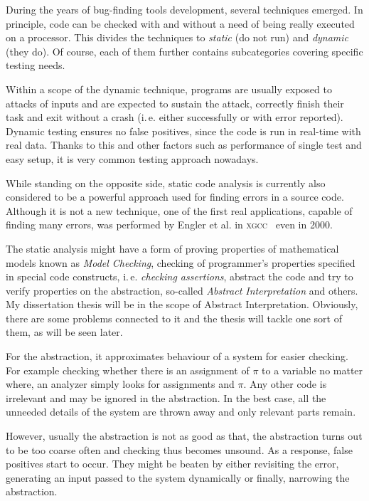 \documentclass[11pt,a4paper]{article}
\begin{document}
During the years of bug-finding tools development, several techniques emerged.
In principle, code can be checked with and without a need of being really
executed on a processor. This divides the techniques to \emph{static} (do not
run) and \emph{dynamic} (they do). Of course, each of them further contains
subcategories covering specific testing needs.

Within a scope of the dynamic technique, programs are usually exposed to
attacks of inputs and are expected to sustain the attack, correctly finish
their task and exit without a crash (i.\,e. either successfully or with error
reported). Dynamic testing ensures no false positives, since the code is run
in real-time with real data. Thanks to this and other factors such as
performance of single test and easy setup, it is very common testing approach
nowadays.

While standing on the opposite side, static code analysis is currently also
considered to be a powerful approach used for finding errors in a source code.
Although it is not a new technique, one of the first real applications,
capable of finding many errors, was performed by Engler et al. in
\textsc{xgcc}~\cite{metal} even in 2000.

The static analysis might have a form of proving properties of mathematical
models known as \emph{Model Checking}, checking of programmer's properties
specified in special code constructs, i.\,e. \emph{checking assertions},
abstract the code and try to verify properties on the abstraction, so-called
\emph{Abstract Interpretation} and others. My dissertation thesis will be
in the scope of Abstract Interpretation. Obviously, there are some problems
connected to it and the thesis will tackle one sort of them, as will be seen
later.

For the abstraction, it approximates behaviour of a system for easier
checking. For example checking whether there is an assignment of $\pi$ to a
variable no matter where, an analyzer simply looks for assignments and $\pi$.
Any other code is irrelevant and may be ignored in the abstraction. In the
best case, all the unneeded details of the system are thrown away and only
relevant parts remain.

However, usually the abstraction is not as good as that, the abstraction turns
out to be too coarse often and checking thus becomes unsound. As a response,
false positives start to occur. They might be beaten by either revisiting the
error, generating an input passed to the system dynamically or finally,
narrowing the abstraction.
\end{document}
